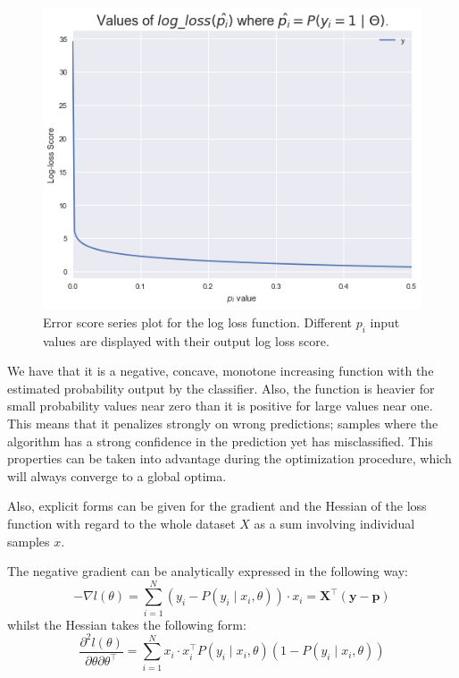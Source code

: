 \begin{appendices}
\begin{figure}[h!]
\begin{center}
\includegraphics[width=0.7\columnwidth]{figures/logloss/figure-logLossValues.png}
\caption{ Error score series plot for the log loss function.
Different $p_i$ input values are displayed with their output log loss score.}
\label{figure-logLossValues}
\end{center}
\end{figure}

We have that it is a negative, concave, monotone increasing function with the estimated probability output by the classifier.
Also, the function is heavier for small probability values near zero than it is positive for large values near one.
This means that it penalizes strongly on wrong predictions; samples where the algorithm has a strong confidence in the prediction yet has misclassified.
This properties can be taken into advantage during the optimization procedure, which will always converge to a global optima.

Also, explicit forms can be given for the gradient and the Hessian of the loss function with regard to the whole dataset $X$ as a sum involving individual samples $x$.

The negative gradient can be analytically expressed in the following way: %
\begin{equation}
- \nabla l(\theta) = \sum_{i=1}^N (y_i - P(y_i \mid x_i,\theta))\cdot x_i = \textbf{X}^{\intercal}(\textbf{y}-\textbf{p})
\label{eq:logitHessian1}
\end{equation}
whilst the Hessian takes the following form:
\begin{equation}
\frac{\partial^2 l(\theta)}{\partial \theta \partial \theta^\intercal} = \sum_{i=1}^N x_i \cdot x_i^\intercal P(y_i \mid x_i,\theta)(1 -P(y_i \mid x_i,\theta))
\label{eq:logitHessian2}
\end{equation}


\end{appendices}
